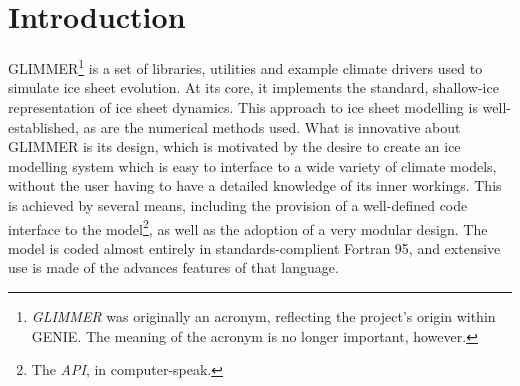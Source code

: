 \section{Introduction}
%
GLIMMER\footnote{{\it GLIMMER} was originally an acronym, reflecting the project's origin within GENIE. The meaning of the acronym is no longer important, however.} is a set of libraries, utilities and example climate drivers used to simulate ice sheet evolution. At its core, it implements the standard, shallow-ice representation of ice sheet dynamics. This approach to ice sheet modelling is well-established, as are the numerical methods used. What is innovative about GLIMMER is its design, which is motivated by the desire to create an ice modelling system which is easy to interface to a wide variety of climate models, without the user having to have a detailed knowledge of its inner workings. This is achieved by several means, including the provision of a well-defined code interface to the model\footnote{The {\it API}, in computer-speak.}, as well as the adoption of a very modular design. The model is coded almost entirely in standards-complient Fortran 95, and extensive use is made of the advances features of that language.
%
